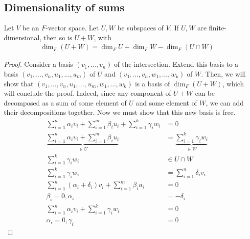     \subsection{Dimensionality of sums}
    \begin{proposition}
        Let $V$ be an $F$-vector space.
        Let $U, W$ be subspaces of $V$.
        If $U, W$ are finite-dimensional, then so is $U + W$, with
        \begin{align*}
            \dim_F (U + W) = \dim_F U + \dim_F W - \dim_F (U \cap W)
        \end{align*}
    \end{proposition}
    \begin{proof}
        Consider a basis $(v_1, \dots, v_n)$ of the intersection.
        Extend this basis to a basis $(v_1, \dots, v_n, u_1, \dots, u_m)$ of $U$ and $(v_1, \dots, v_n, w_1, \dots, w_k)$ of $W$.
        Then, we will show that $(v_1, \dots, v_n, u_1, \dots, u_m, w_1, \dots, w_k)$ is a basis of $\dim_F (U + W)$, which will conclude the proof.
        Indeed, since any component of $U + W$ can be decomposed as a sum of some element of $U$ and some element of $W$, we can add their decompositions together.
        Now we must show that this new basis is free.
        \begin{align*}
            \sum_{i=1}^n \alpha_i v_i + \sum_{i=1}^m \beta_i u_i + \sum_{i=1}^k \gamma_i w_i & = 0                                              \\
            \underbrace{\sum_{i=1}^n \alpha_i v_i + \sum_{i=1}^m \beta_i u_i}_{\in U}        & = \underbrace{\sum_{i=1}^k \gamma_i w_i}_{\in W} \\
            \sum_{i=1}^k \gamma_i w_i                                                        & \in U \cap W                                     \\
            \sum_{i=1}^k \gamma_i w_i                                                        & = \sum_{i=1}^n \delta_i v_i                      \\
            \sum_{i=1}^n (\alpha_i + \delta_i) v_i + \sum_{i=1}^m \beta_i u_i                & = 0                                              \\
            \beta_i = 0, \alpha_i                                                            & = -\delta_i                                      \\
            \sum_{i=1}^n \alpha_i v_i + \sum_{i=1}^k \gamma_i w_i                            & = 0                                              \\
            \alpha_i = 0, \gamma_i                                                           & = 0
        \end{align*}
    \end{proof}
